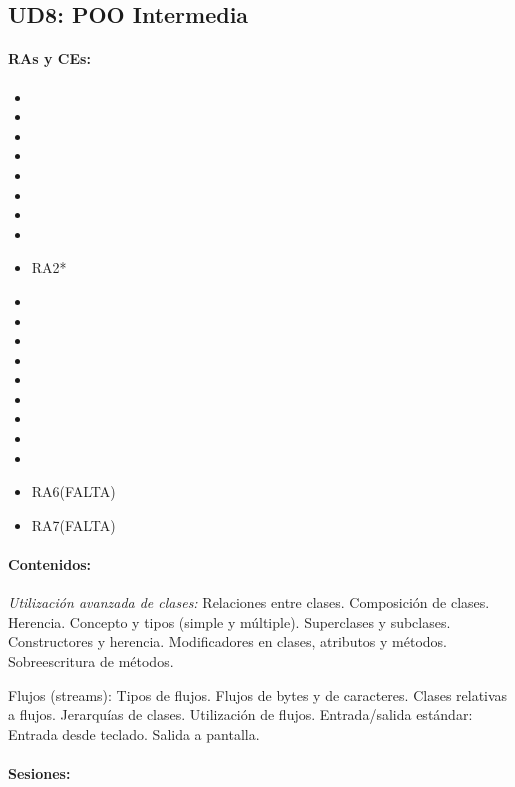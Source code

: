 \newpage
\subsection{UD8: POO Intermedia}

	\paragraph{RAs y CEs:}
	\begin{itemize}[itemsep=0.1em, topsep=0.1em]
		\item\RAUNOf
		\item\RAUNOi		
		\item\RATRESe
		\item\RATRESf
		\item\RATRESg
		\item\RACINCOa
		\item\RACINCOb
		\item\RACINCOc		
		\item RA2*
		\item\RACUATROa
		\item\RACUATROb
		\item\RACUATROc
		\item\RACUATROd
		\item\RACUATROe
		\item\RACUATROf
		\item\RACUATROg
		\item\RACUATROh
		\item\RACUATROi
		\item RA6(FALTA)
		\item RA7(FALTA)
	\end{itemize}



	\paragraph{Contenidos:}
		\emph{Utilización avanzada de clases:}
		Relaciones entre clases. Composición de clases.
		Herencia. Concepto y tipos (simple y múltiple).
		Superclases y subclases.
		Constructores y herencia.
		Modificadores en clases, atributos y métodos.
		Sobreescritura de métodos.

		Flujos (streams): Tipos de flujos. Flujos de bytes y de caracteres. Clases relativas a flujos. Jerarquías de clases. Utilización de flujos.
		Entrada/salida estándar: Entrada desde teclado. Salida a pantalla.


	\paragraph{Sesiones:}
